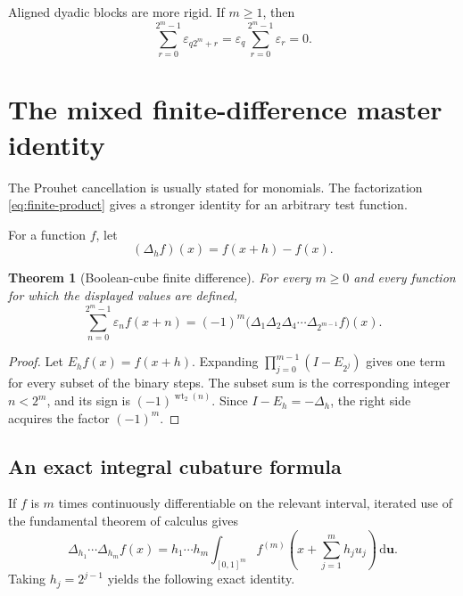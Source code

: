 \documentclass[11pt,oneside]{article}
\newtheorem{theorem}{Theorem}[section]
\theoremstyle{definition}
\theoremstyle{remark}
\newcommand{\dd}{\,\mathrm d}
\newcommand{\wt}{\operatorname{wt}_2}
\begin{document}
Aligned dyadic blocks are more rigid.  If \(m\ge1\), then
\begin{equation}
 \sum_{r=0}^{2^m-1}\varepsilon_{q2^m+r}
 =\varepsilon_q\sum_{r=0}^{2^m-1}\varepsilon_r=0.
 \label{eq:aligned-block-zero}
\end{equation}

\section{The mixed finite-difference master identity}
\label{sec:finite-difference}

The Prouhet cancellation is usually stated for monomials.  The factorization
\eqref{eq:finite-product} gives a stronger identity for an arbitrary test
function.

For a function \(f\), let
\begin{equation}
 (\Delta_hf)(x)=f(x+h)-f(x).
 \label{eq:delta-def}
\end{equation}

\begin{theorem}[Boolean-cube finite difference]
\label{thm:finite-difference-master}
For every \(m\ge0\) and every function for which the displayed values are
defined,
\begin{equation}
 \boxed{\quad
 \sum_{n=0}^{2^m-1}\varepsilon_nf(x+n)
 =(-1)^m\bigl(\Delta_1\Delta_2\Delta_4\cdots
       \Delta_{2^{m-1}}f\bigr)(x).
 \quad}
 \label{eq:finite-difference-master}
\end{equation}
\end{theorem}

\begin{proof}
Let \(E_hf(x)=f(x+h)\).  Expanding
\(\prod_{j=0}^{m-1}(I-E_{2^j})\) gives one term for every subset of the binary
steps.  The subset sum is the corresponding integer \(n<2^m\), and its sign
is \((-1)^{\wt(n)}\).  Since \(I-E_h=-\Delta_h\), the right side acquires the
factor \((-1)^m\).
\end{proof}

\subsection{An exact integral cubature formula}

If \(f\) is \(m\) times continuously differentiable on the relevant interval,
iterated use of the fundamental theorem of calculus gives
\begin{equation}
 \Delta_{h_1}\cdots\Delta_{h_m}f(x)
 =h_1\cdots h_m
  \int_{[0,1]^m}f^{(m)}\!\left(x+\sum_{j=1}^mh_ju_j\right)
  \dd\bm u.
 \label{eq:iterated-difference-integral}
\end{equation}
Taking \(h_j=2^{j-1}\) yields the following exact identity.
\end{document}

